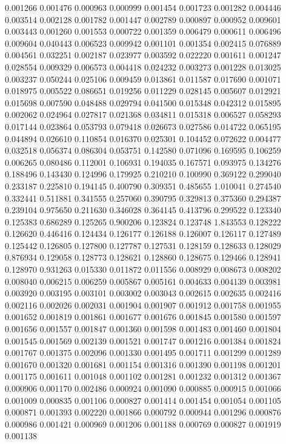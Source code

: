 0.001266
0.001476
0.000963
0.000999
0.001454
0.001723
0.001282
0.004446
0.003514
0.002128
0.001782
0.001447
0.002789
0.000897
0.000952
0.009601
0.003443
0.001260
0.001553
0.000722
0.001359
0.006479
0.000611
0.006496
0.009604
0.040443
0.006523
0.009942
0.001101
0.001354
0.002415
0.076889
0.004561
0.032251
0.002187
0.023977
0.003592
0.022220
0.001611
0.001247
0.028554
0.009329
0.006573
0.004418
0.024232
0.003273
0.001228
0.013025
0.003237
0.050244
0.025106
0.009459
0.013861
0.011587
0.017690
0.001071
0.018975
0.005522
0.086651
0.019256
0.011229
0.028145
0.005607
0.012921
0.015698
0.007590
0.048488
0.029794
0.041500
0.015348
0.042312
0.015895
0.002062
0.024964
0.027817
0.021368
0.034811
0.015318
0.006527
0.058293
0.017144
0.023864
0.053793
0.079418
0.026673
0.027586
0.014722
0.065195
0.044894
0.026610
0.110854
0.016370
0.025301
0.104452
0.072622
0.004477
0.032518
0.056374
0.086304
0.053751
0.142580
0.071096
0.169595
0.106259
0.006265
0.080486
0.112001
0.106931
0.194035
0.167571
0.093975
0.134276
0.188496
0.143430
0.124996
0.179925
0.210210
0.100990
0.369122
0.299040
0.233187
0.225810
0.194145
0.400790
0.309351
0.485655
1.010041
0.274540
0.332441
0.511881
0.341555
0.257060
0.390795
0.329813
0.375360
0.294387
0.239104
0.975650
0.211630
0.346028
0.364145
0.413796
0.299522
0.123340
0.125383
0.686289
0.125265
0.900206
0.123824
0.123748
1.843553
0.128222
0.126620
0.446416
0.124434
0.126177
0.126188
0.126007
0.126117
0.127489
0.125442
0.126805
0.127800
0.127787
0.127531
0.128159
0.128633
0.128029
0.876934
0.129058
0.128773
0.128621
0.128860
0.128675
0.129466
0.128941
0.128970
0.931263
0.015330
0.011872
0.011556
0.008929
0.008673
0.008202
0.008040
0.006215
0.006259
0.005867
0.005161
0.004633
0.004139
0.003981
0.003920
0.003195
0.003101
0.003002
0.003043
0.002615
0.002635
0.002416
0.002116
0.002026
0.002031
0.001904
0.001907
0.001912
0.001758
0.001955
0.001652
0.001819
0.001861
0.001677
0.001676
0.001845
0.001580
0.001597
0.001656
0.001557
0.001847
0.001360
0.001598
0.001483
0.001460
0.001804
0.001545
0.001569
0.002139
0.001521
0.001747
0.001216
0.001384
0.001824
0.001767
0.001375
0.002096
0.001330
0.001495
0.001711
0.001299
0.001289
0.001670
0.001320
0.001681
0.001154
0.001316
0.001390
0.001198
0.001201
0.001175
0.001611
0.001048
0.001102
0.001281
0.001232
0.001312
0.001367
0.000906
0.001170
0.002486
0.000924
0.001090
0.000885
0.000915
0.001066
0.001009
0.000835
0.001106
0.000827
0.001414
0.001454
0.001054
0.001105
0.000871
0.001393
0.002220
0.001866
0.000792
0.000944
0.001296
0.000876
0.000986
0.001421
0.000969
0.001206
0.001188
0.000769
0.000827
0.001919
0.001138
